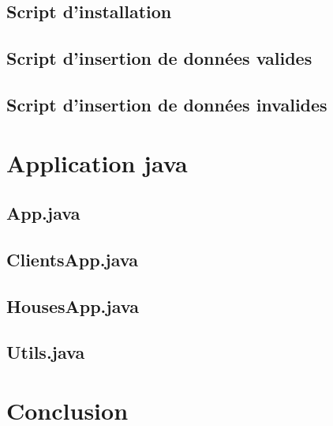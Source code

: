 \documentclass[11pt,a4paper]{report}
\begin{document}
\section{Script d'installation}

\newpage

\section{Script d'insertion de données valides}

\newpage

\section{Script d'insertion de données invalides}

\newpage

\chapter{Application java}
\section{App.java}

\newpage

\section{ClientsApp.java}

\newpage

\section{HousesApp.java}

\newpage

\section{Utils.java}

\newpage

\chapter{Conclusion}
\end{document}
